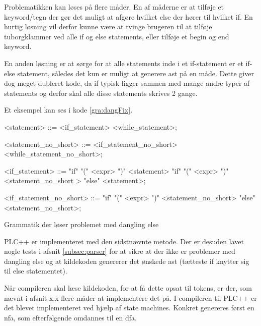 
\noindent Problematikken kan løses på flere måder. En af måderne er at tilføje et keyword/tegn der gør det muligt at afgøre hvilket else der hører til hvilket if. En hurtig løsning vil derfor kunne være at tvinge brugeren til at tilføje tuborgklammer ved alle if og else statements, eller tilføje et begin og end keyword.

En anden løsning er at sørge for at alle statements inde i et if-statement er et if-else statement, således det kun er muligt at generere \gls{ast} på en måde. Dette giver dog meget dubleret kode, da if typisk ligger sammen med mange andre typer af statements og derfor skal alle disse statements skrives 2 gange.

Et eksempel kan ses i kode \ref{gra:dangFix}.

\begin{Grammar}
 \begin{grammar}
    <statement> ::= <if\_statement>
    \alt <while\_statement>;
    
    <statement\_no\_short> ::= <if\_statement\_no\_short>
    \alt <while\_statement\_no\_short>;
    
    <if\_statement> ::= "if" "(" <expr> ")" <statement> 
    \alt"if" "(" <expr> ")" <statement\_no\_short > "else" <statement>;
    
    <if\_statement\_no\_short> ::= "if" "(" <expr> ")" <statement\_no\_short> "else" <statement\_no\_short>;
 \end{grammar}
 \caption{Grammatik der løser problemet med dangling else}\label{gra:dangFix}
\end{Grammar}

\noindent PLC++ er implementeret med den sidstnævnte metode. Der er desuden lavet nogle tests i afsnit \ref{subsec:parser} for at sikre at der ikke er problemer med dangling else og at kildekoden genererer det ønskede \gls{ast} (tætteste if knytter sig til else statementet).

\noindent Når compileren skal læse kildekoden, for at få dette opsat til tokens, er der, som nævnt i afsnit x.x flere måder at implementere det på. I compileren til PLC++ er det blevet implementeret ved hjælp af state machines. Konkret genereres først en \gls{nfa}, som efterfølgende omdannes til en \gls{dfa}.


